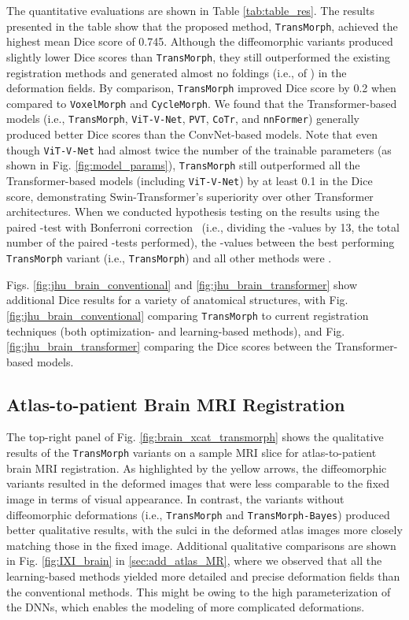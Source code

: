 \documentclass[times,twocolumn,final]{elsarticle}
\begin{document}
The quantitative evaluations are shown in Table \ref{tab:table_res}. The results presented in the table show that the proposed method, \texttt{TransMorph}, achieved the highest mean Dice score of 0.745. Although the diffeomorphic variants produced slightly lower Dice scores than \texttt{TransMorph}, they still outperformed the existing registration methods and generated almost no foldings (i.e.,  of ) in the deformation fields. By comparison, \texttt{TransMorph} improved Dice score by 0.2 when compared to \texttt{VoxelMorph} and \texttt{CycleMorph}. We found that the Transformer-based models (i.e., \texttt{TransMorph}, \texttt{ViT-V-Net}, \texttt{PVT}, \texttt{CoTr}, and \texttt{nnFormer}) generally produced better Dice scores than the ConvNet-based models. Note that even though \texttt{ViT-V-Net} had almost twice the number of the trainable parameters (as shown in Fig. \ref{fig:model_params}), \texttt{TransMorph} still outperformed all the Transformer-based models (including \texttt{ViT-V-Net}) by at least 0.1 in the Dice score, demonstrating Swin-Transformer's superiority over other Transformer architectures. When we conducted hypothesis testing on the results using the paired -test with Bonferroni correction~\cite{armstrong2014use} (i.e., dividing the -values by 13, the total number of the paired -tests performed), the -values between the best performing \texttt{TransMorph} variant (i.e., \texttt{TransMorph}) and all other methods were .

Figs. \ref{fig:jhu_brain_conventional} and \ref{fig:jhu_brain_transformer} show additional Dice results for a variety of anatomical structures, with Fig. \ref{fig:jhu_brain_conventional} comparing \texttt{TransMorph} to current registration techniques (both optimization- and learning-based methods), and Fig. \ref{fig:jhu_brain_transformer} comparing the Dice scores between the Transformer-based models.

\subsection{Atlas-to-patient Brain MRI Registration}
The top-right panel of Fig. \ref{fig:brain_xcat_transmorph} shows the qualitative results of the \texttt{TransMorph} variants on a sample MRI slice for atlas-to-patient brain MRI registration. As highlighted by the yellow arrows, the diffeomorphic variants resulted in the deformed images that were less comparable to the fixed image in terms of visual appearance. In contrast, the variants without diffeomorphic deformations (i.e., \texttt{TransMorph} and \texttt{TransMorph-Bayes}) produced better qualitative results, with the sulci in the deformed atlas images more closely matching those in the fixed image. Additional qualitative comparisons are shown in Fig. \ref{fig:IXI_brain} in \ref{sec:add_atlas_MR}, where we observed that all the learning-based methods yielded more detailed and precise deformation fields than the conventional methods. This might be owing to the high parameterization of the DNNs, which enables the modeling of more complicated deformations.
\end{document}
